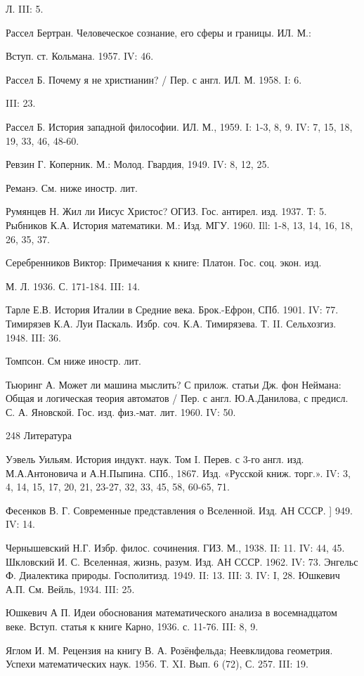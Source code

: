 Л. III: 5.

Рассел Бертран. Человеческое сознание, его сферы и границы. ИЛ. М.:

Вступ. ст. Кольмана. 1957. IV: 46.

Рассел Б. Почему я не христианин? / Пер. с англ. ИЛ. М. 1958. I: 6.

III: 23.

Рассел Б. История западной философии. ИЛ. М., 1959. I: 1-3, 8, 9. IV:
7, 15, 18, 19, 33, 46, 48-60.

Ревзин Г. Коперник. М.: Молод. Гвардия, 1949. IV: 8, 12, 25.

Реманэ. См. ниже иностр. лит.

Румянцев Н. Жил ли Иисус Христос? ОГИЗ. Гос. антирел. изд. 1937. Т:
5. Рыбников К.А. История математики. М.: Изд. МГУ. 1960. Ill: 1-8, 13,
14, 16, 18, 26, 35, 37.

Серебренников Виктор: Примечания к книге: Платон. Гос. соц. экон.
изд.

М. Л. 1936. С. 171-184. III: 14.

Тарле Е.В. История Италии в Средние века. Брок.-Ефрон, СПб. 1901. IV:
77. Тимирязев К.А. Луи Паскаль. Избр. соч. К.А. Тимирязева. Т. II.
Сельхозгиз. 1948. III: 36.

Томпсон. См ниже иностр. лит.

Тьюринг А. Может ли машина мыслить? С прилож. статьи Дж. фон Неймана:
Общая и логическая теория автоматов / Пер. с англ. Ю.А.Данилова, с
предисл. С. А. Яновской. Гос. изд. физ.-мат. лит. 1960. IV: 50.

248 Литература

Уэвель Уильям. История индукт. наук. Том I. Перев. с 3-го англ. изд.
М.А.Антоновича и А.Н.Пыпина. СПб., 1867. Изд. «Русской книж. торг.».
IV: 3, 4, 14, 15, 17, 20, 21, 23-27, 32, 33, 45, 58, 60-65, 71.

Фесенков В. Г. Современные представления о Вселенной. Изд. АН СССР. ]
949. IV: 14.

Чернышевский Н.Г. Избр. филос. сочинения. ГИЗ. М., 1938. II: 11. IV:
44, 45. Шкловский И. С. Вселенная, жизнь, разум. Изд. АН СССР. 1962.
IV: 73. Энгельс Ф. Диалектика природы. Госполитизд. 1949. II: 13. III:
3. IV: I, 28. Юшкевич А.П. См. Вейль, 1934. III: 25.

Юшкевич А П. Идеи обоснования математического анализа в восемнадцатом
веке. Вступ. статья к книге Карно, 1936. с. 11-76. III: 8, 9.

Яглом И. М. Рецензия на книгу В. А. Розёнфельда; Неевклидова
геометрия. Успехи математических наук. 1956. Т. XI. Вып. 6 (72), С.
257. III: 19.

